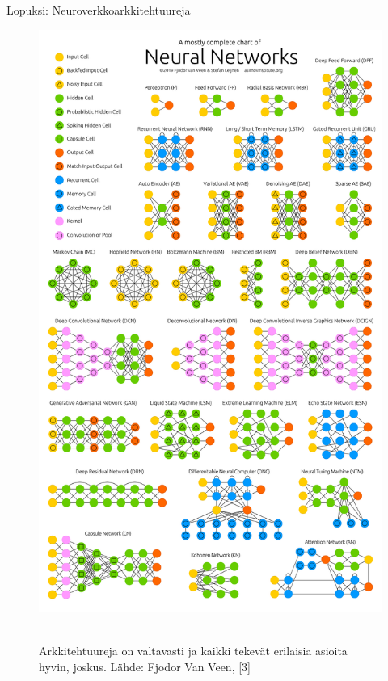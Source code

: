 \documentclass[presentation]{beamer}
\begin{document}
\begin{frame}{Lopuksi: Neuroverkkoarkkitehtuureja}

	\begin{figure}
				\includegraphics[height=0.65\textheight]{NeuralNetworkZo19High.png} \

				\caption*{Arkkitehtuureja on valtavasti ja kaikki tekevät erilaisia asioita hyvin, joskus. Lähde: Fjodor Van Veen, [3]}
	\end{figure}

    
\end{frame}
\end{document}
